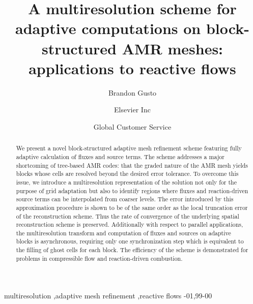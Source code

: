 \documentclass[review]{elsarticle}
\begin{document}
\begin{frontmatter}

\title{A multiresolution scheme for adaptive computations on block-structured AMR meshes: applications to reactive flows}

\author{Brandon Gusto}
\address{Radarweg 29, Amsterdam}

\author[mymainaddrass,mysecondaryaddress]{Elsevier Inc}

\author[mysecondaryaddress]{Global Customer Service}

\address[mymainaddress]{1600 John F Kennedy Boulevard, Philadelphia}
\address[mysecondaryaddress]{360 Park Avenue South, New York}

\begin{abstract}
    We present a novel block-structured adaptive mesh refinement scheme
    featuring fully adaptive calculation of fluxes and source terms. The scheme
    addresses a major shortcoming of tree-based AMR codes: that the graded
    nature of the AMR mesh yields blocks whose cells are resolved beyond the
    desired error tolerance. To overcome this issue, we introduce a
    multiresolution representation of the solution not only for the purpose of
    grid adaptation but also to identify regions where fluxes and
    reaction-driven source terms can be interpolated from coarser levels. The
    error introduced by this approximation procedure is shown to be of the same
    order as the local truncation error of the reconstruction scheme. Thus the
    rate of convergence of the underlying spatial reconstruction scheme is
    preserved.  Additionally with respect to parallel applications, the
    multiresolution transform and computation of fluxes and sources on adaptive
    blocks is asynchronous, requiring only one synchronization step which is
    equivalent to the filling of ghost cells for each block. The efficiency of
    the scheme is demonstrated for problems in compressible flow and
    reaction-driven combustion.
\end{abstract}

\begin{keyword}
multiresolution \sep adaptive mesh refinement \sep reactive flows
-01\sep  99-00
\end{keyword}

\end{frontmatter}
\end{document}

